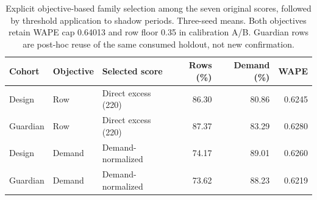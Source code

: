 \begin{table}[t]
\centering\small
\caption{Explicit objective-based family selection among the seven original scores, followed by threshold application to shadow periods. Three-seed means. Both objectives retain WAPE cap 0.64013 and row floor 0.35 in calibration A/B. Guardian rows are post-hoc reuse of the same consumed holdout, not new confirmation.}
\label{tab:objectives}
\begin{tabular}{lllrrr}\toprule
Cohort & Objective & Selected score & Rows (\%) & Demand (\%) & WAPE\\\midrule
Design & Row & Direct excess (220) & 86.30 & 80.86 & 0.6245 \\
Guardian & Row & Direct excess (220) & 87.37 & 83.29 & 0.6280 \\
Design & Demand & Demand-normalized & 74.17 & 89.01 & 0.6260 \\
Guardian & Demand & Demand-normalized & 73.62 & 88.23 & 0.6219 \\
\bottomrule\end{tabular}
\end{table}
